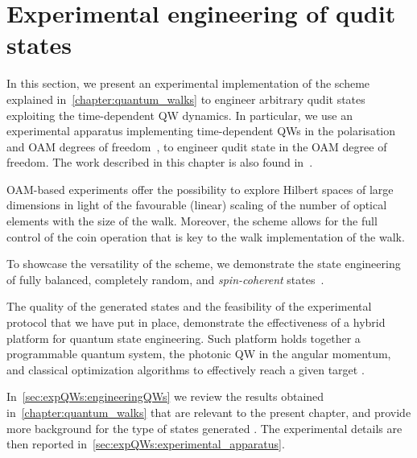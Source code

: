 
\chapter{Experimental engineering of qudit states}
\label{chapter:experimental_engineering_qudits}

 In this section, we present an experimental implementation of the scheme explained in~\cref{chapter:quantum_walks} to engineer arbitrary qudit states exploiting the time-dependent \ac{QW} dynamics.
In particular, we use an experimental apparatus implementing time-dependent \acp{QW} in the polarisation and \ac{OAM} degrees of freedom~\cite{zhang2010implementation,goyal2013implementing,cardano2015quantum}, to engineer qudit state in the \ac{OAM} degree of freedom.
The work described in this chapter is also found in~\cite{giordani2019experimental}.

 \ac{OAM}-based experiments offer the possibility to explore Hilbert spaces of large dimensions in light of the favourable (linear) scaling of the number of optical elements with the size of the walk. Moreover, the scheme allows for the full control of the coin operation that is key to the walk implementation of the walk.

To showcase the versatility of the scheme, we demonstrate the state engineering of fully balanced, completely random, and \emph{spin-coherent} states~\cite{brune1992manipulation,monroe1996schrodinger}.

The quality of the generated states and the feasibility of the experimental protocol that we have put in place, demonstrate the effectiveness of a hybrid platform for quantum state engineering. Such platform holds together a programmable quantum system, the photonic \ac{QW} in the angular momentum, and classical optimization algorithms to effectively reach a given target .

In~\cref{sec:expQWs:engineeringQWs} we review the results obtained in~\cref{chapter:quantum_walks} that are relevant to the present chapter, and provide more background for the type of states generated . The experimental details are then reported in~\cref{sec:expQWs:experimental_apparatus}.

